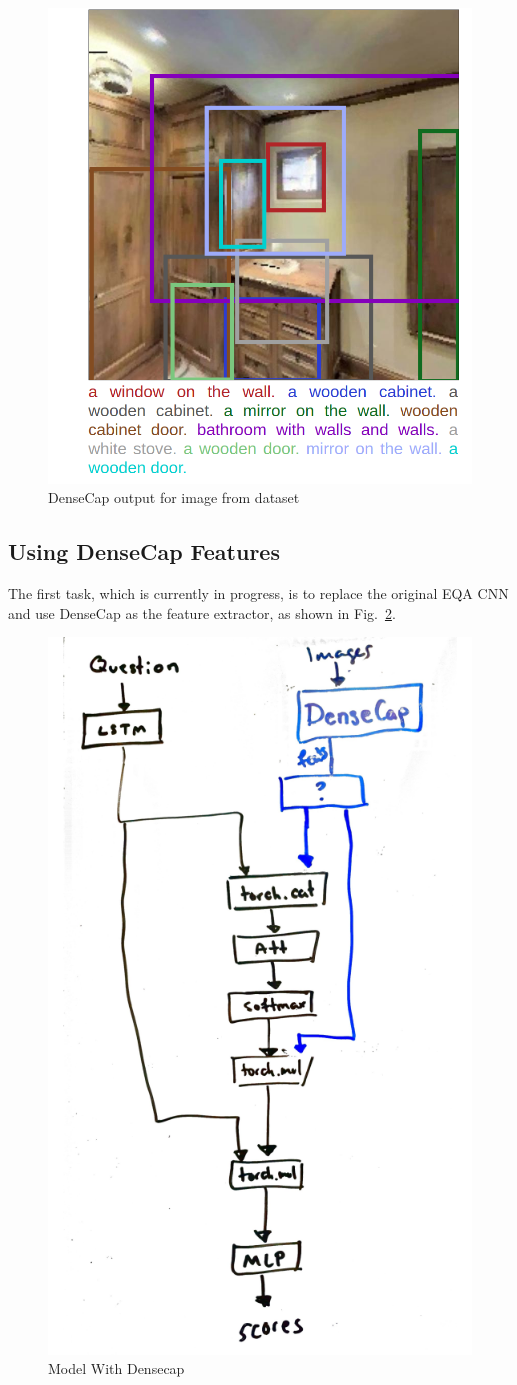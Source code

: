 \begin{figure}[h]
     \centering
     \includegraphics[width=.5\textwidth]{./figure/example_densecap.png}
     \caption{DenseCap output for image from dataset}
     \label{fig:example_densecap}
\end{figure}



\subsection{Using DenseCap Features}
The first task, which is currently in progress, is to replace the original EQA CNN and use DenseCap as the feature extractor, as shown in Fig.~\ref{fig:densecap_feats}.

\begin{figure}[h]
     \centering
     \includegraphics[width=.5\textwidth]{./figure/densecapsketch.png}
     \caption{Model With Densecap}
     \label{fig:densecap_feats}
\end{figure}


